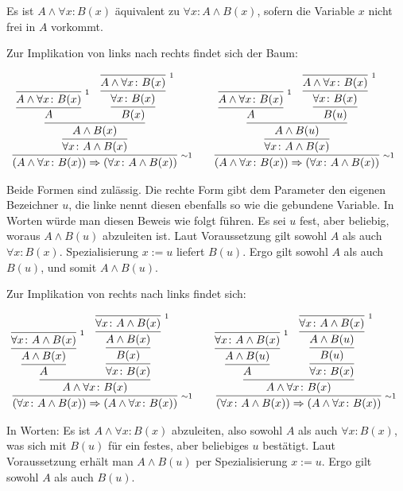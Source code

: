 \begin{Satz}
Es ist $A\land\forall x\colon B(x)$ äquivalent zu $\forall x\colon A\land B(x)$,
sofern die Variable $x$ nicht frei in $A$ vorkommt.
\end{Satz}
\begin{Beweis}
Zur Implikation von links nach rechts findet sich der Baum:
\begin{small}
\[
\begin{array}{@{}l@{\qquad}l}
\infer[\infernote{$\sim$1}]{(A\land\forall x\colon B(x))\cond (\forall x\colon A\land B(x))}{
  \infer{\forall x\colon A\land B(x)}{
    \infer{A\land B(x)}{
      \infer{A}{
        \infer[\infernote{1}]{A\land\forall x\colon B(x)}{}}
    & \infer{B(x)}{
        \infer{\forall x\colon B(x)}{
          \infer[\infernote{1}]{A\land\forall x\colon B(x)}{}}}}}}
&
\infer[\infernote{$\sim$1}]{(A\land\forall x\colon B(x))\cond (\forall x\colon A\land B(x))}{
  \infer{\forall x\colon A\land B(x)}{
    \infer{A\land B(u)}{
      \infer{A}{
        \infer[\infernote{1}]{A\land\forall x\colon B(x)}{}}
    & \infer{B(u)}{
        \infer{\forall x\colon B(x)}{
          \infer[\infernote{1}]{A\land\forall x\colon B(x)}{}}}}}}
\end{array}
\]
\end{small}%
Beide Formen sind zulässig. Die rechte Form gibt dem Parameter den
eigenen Bezeichner $u$, die linke nennt diesen ebenfalls so wie die
gebundene Variable. In Worten würde man diesen Beweis wie folgt
führen. Es sei $u$ fest, aber beliebig, woraus $A\land B(u)$ abzuleiten
ist. Laut Voraussetzung gilt sowohl $A$ als auch $\forall x\colon B(x)$.
Spezialisierung $x:=u$ liefert $B(u)$. Ergo gilt sowohl $A$ als
auch $B(u)$, und somit $A\land B(u)$.

Zur Implikation von rechts nach links findet sich:
\begin{small}
\[
\begin{array}{@{}l@{\qquad}l}
\infer[\infernote{$\sim$1}]{(\forall x\colon A\land B(x))\cond (A\land\forall x\colon B(x))}{
  \infer{A\land\forall x\colon B(x)}{
    \infer{A}{
      \infer{A\land B(x)}{
        \infer[\infernote{1}]{\forall x\colon A\land B(x)}{}}}
  & \infer{\forall x\colon B(x)}{
      \infer{B(x)}{
        \infer{A\land B(x)}{
          \infer[\infernote{1}]{\forall x\colon A\land B(x)}{}}}}}}
&
\infer[\infernote{$\sim$1}]{(\forall x\colon A\land B(x))\cond (A\land\forall x\colon B(x))}{
  \infer{A\land\forall x\colon B(x)}{
    \infer{A}{
      \infer{A\land B(u)}{
        \infer[\infernote{1}]{\forall x\colon A\land B(x)}{}}}
  & \infer{\forall x\colon B(x)}{
      \infer{B(u)}{
        \infer{A\land B(u)}{
          \infer[\infernote{1}]{\forall x\colon A\land B(x)}{}}}}}}
\end{array}
\]
\end{small}%
In Worten: Es ist $A\land\forall x\colon B(x)$ abzuleiten, also
sowohl $A$ als auch $\forall x\colon B(x)$, was sich mit $B(u)$ für ein
festes, aber beliebiges $u$ bestätigt. Laut Voraussetzung erhält man
$A\land B(u)$ per Spezialisierung $x:=u$. Ergo gilt sowohl $A$ als
auch $B(u)$.\,\qedsymbol
\end{Beweis}

